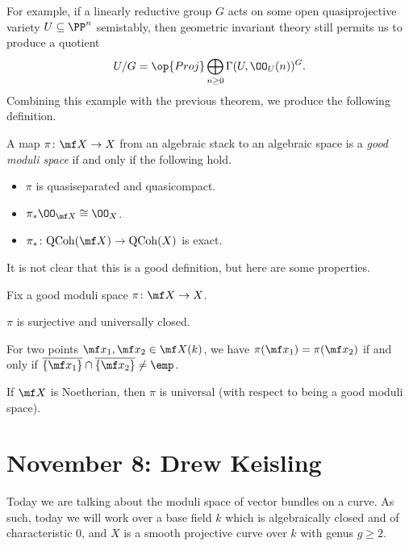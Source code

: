 \documentclass{article}
\begin{document}
For example, if a linearly reductive group $G$ acts on some open quasiprojective variety $U\subseteq\PP^n$ semistably, then geometric invariant theory still permits us to produce a quotient
\[U/G=\op{Proj}\bigoplus_{n\ge0}\Gamma(U,\OO_U(n))^G.\]
Combining this example with the previous theorem, we produce the following definition.
\begin{definition}
    A map $\pi\colon\mf X\to X$ from an algebraic stack to an algebraic space is a \textit{good moduli space} if and only if the following hold.
    \begin{itemize}
        \item $\pi$ is quasiseparated and quasicompact.
        \item $\pi_*\OO_{\mf X}\cong\OO_X$.
        \item $\pi_*\colon\mathrm{QCoh}(\mf X)\to\mathrm{QCoh}(X)$ is exact.
    \end{itemize}
\end{definition}
It is not clear that this is a good definition, but here are some properties.
\begin{theorem}
    Fix a good moduli space $\pi\colon\mf X\to X$.
    \begin{listalph}
        \item $\pi$ is surjective and universally closed.
        \item For two points $\mf x_1,\mf x_2\in\mf X(k)$, we have $\pi(\mf x_1)=\pi(\mf x_2)$ if and only if $\overline{\{\mf x_1\}}\cap\overline{\{\mf x_2\}}\ne\emp$.
        \item If $\mf X$ is Noetherian, then $\pi$ is universal (with respect to being a good moduli space).
    \end{listalph}
\end{theorem}

\section{November 8: Drew Keisling}
Today we are talking about the moduli space of vector bundles on a curve. As such, today we will work over a base field $k$ which is algebraically closed and of characteristic $0$, and $X$ is a smooth projective curve over $k$ with genus $g\ge2$.
\end{document}
